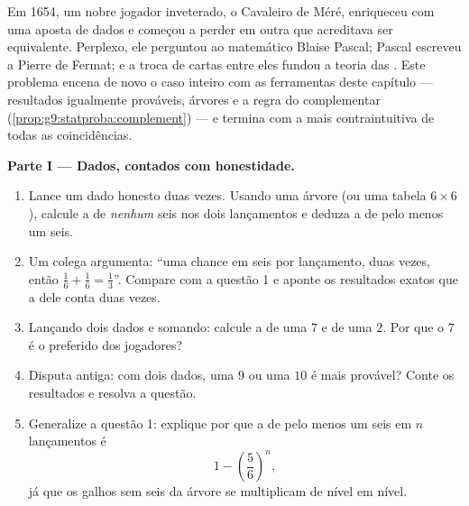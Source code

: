 \begin{problem}
\label{pb:g9:statproba:1}
Em 1654, um nobre jogador inveterado, o Cavaleiro de Méré,
enriqueceu com uma aposta de dados e começou a perder em outra que
acreditava ser equivalente. Perplexo, ele perguntou ao matemático
Blaise Pascal; Pascal escreveu a Pierre de Fermat; e a troca de cartas
entre eles fundou a teoria das . Este problema encena de
novo o caso inteiro com as ferramentas deste capítulo --- resultados
igualmente prováveis, árvores e a regra do complementar
(\cref{prop:g9:statproba:complement}) --- e termina com a mais
contraintuitiva de todas as coincidências.

\medskip
\noindent\textbf{Parte I --- Dados, contados com honestidade.}
\begin{enumerate}
  \item Lance um dado honesto duas vezes. Usando uma árvore (ou uma
        tabela $6 \times 6$), calcule a  de \emph{nenhum}
        seis nos dois lançamentos e deduza a  de pelo
        menos um seis.
  \item Um colega argumenta: ``uma chance em seis por lançamento, duas
        vezes, então $\frac16 + \frac16 = \frac13$''. Compare com a
        questão 1 e aponte os resultados exatos que a  dele conta
        duas vezes.
  \item Lançando dois dados e somando: calcule a  de uma
         $7$ e de uma  $2$. Por que o $7$ é o preferido dos
        jogadores?
  \item Disputa antiga: com dois dados, uma  $9$ ou uma  $10$ é
        mais provável? Conte os resultados e resolva a questão.
  \item Generalize a questão 1: explique por que a  de
        pelo menos um seis em $n$ lançamentos é
        \[
        1 - \left(\frac56\right)^{\!n} ,
        \]
        já que os galhos sem seis da árvore se multiplicam de nível em
        nível.
\end{enumerate}


\end{problem}

